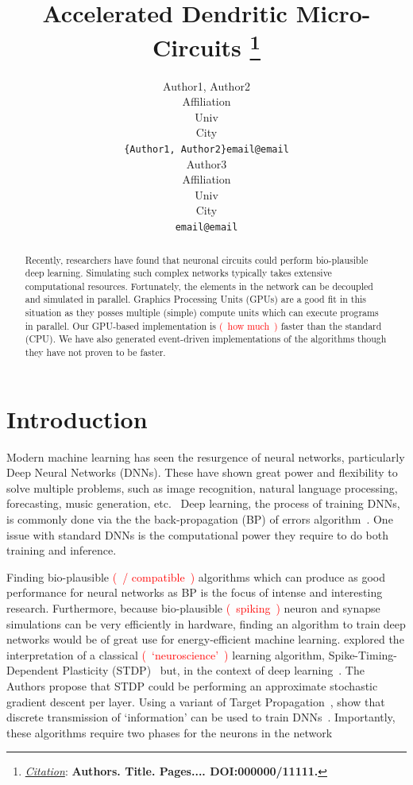 \documentclass{article}
\title{Accelerated Dendritic Micro-Circuits
\thanks{\textit{\underline{Citation}}: 
\textbf{Authors. Title. Pages.... DOI:000000/11111.}} 
}
\author{
  Author1, Author2 \\
  Affiliation \\
  Univ \\
  City\\
  \texttt{\{Author1, Author2\}email@email} \\
   \And
  Author3 \\
  Affiliation \\
  Univ \\
  City\\
  \texttt{email@email} \\
}
\newcommand\note[1]{\textcolor{red}{(~#1~)}}
\begin{document}
\maketitle


\begin{abstract}
Recently, researchers have found that neuronal circuits could perform bio-plausible deep learning. 
Simulating such complex networks typically takes extensive computational resources. 
Fortunately, the elements in the network can be decoupled and simulated in parallel.
Graphics Processing Units (GPUs) are a good fit in this situation as they posses multiple (simple) compute units which can execute programs in parallel.
Our GPU-based implementation is \note{how much} faster than the standard (CPU).
We have also generated event-driven implementations of the algorithms though they have not proven to be faster.

\end{abstract}




\section{Introduction}
Modern machine learning has seen the resurgence of neural networks, particularly Deep Neural Networks (DNNs). 
These have shown great power and flexibility to solve multiple problems, such as image recognition, natural language processing, forecasting, music generation, etc.~\citep{deep-learning-book,deep-learning-nature}
Deep learning, the process of training DNNs, is commonly done via the the back-propagation (BP) of errors algorithm~\cite{backprop}.
One issue with standard DNNs is the computational power they require to do both training and inference.

Finding bio-plausible \note{/ compatible} algorithms which can produce as good performance for neural networks as BP is the focus of intense and interesting research.
Furthermore, because bio-plausible \note{spiking} neuron and synapse simulations can be very efficiently in hardware, finding an algorithm to train deep networks would be of great use for energy-efficient machine learning.
\citeauthor{bengio_bio_deep} explored the interpretation of a classical \note{`neuroscience'} learning algorithm, Spike-Timing-Dependent Plasticity (STDP)~\citep{stdp} but, in the context of deep learning~\citep{bengio_bio_deep}.
The Authors propose that STDP could be performing an approximate stochastic gradient descent per layer.
Using a variant of Target Propagation~\cite{target-prop}, \citeauthor{lee_diff_prop} show that discrete transmission of `information' can be used to train DNNs~\citep{lee_diff_prop}.
Importantly, these algorithms require two phases for the neurons in the network
\end{document}
